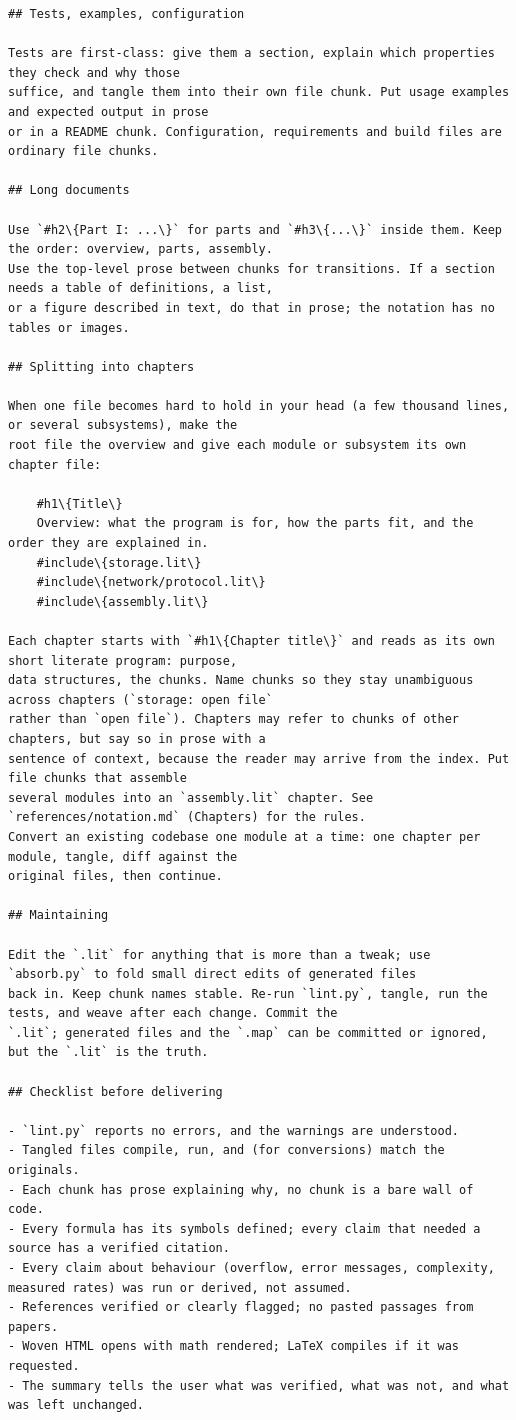 \documentclass[10pt,a4paper]{article}
\newcounter{chunk}
\begin{document}
\begin{Verbatim}
## Tests, examples, configuration

Tests are first-class: give them a section, explain which properties they check and why those
suffice, and tangle them into their own file chunk. Put usage examples and expected output in prose
or in a README chunk. Configuration, requirements and build files are ordinary file chunks.

## Long documents

Use `#h2\{Part I: ...\}` for parts and `#h3\{...\}` inside them. Keep the order: overview, parts, assembly.
Use the top-level prose between chunks for transitions. If a section needs a table of definitions, a list,
or a figure described in text, do that in prose; the notation has no tables or images.

## Splitting into chapters

When one file becomes hard to hold in your head (a few thousand lines, or several subsystems), make the
root file the overview and give each module or subsystem its own chapter file:

    #h1\{Title\}
    Overview: what the program is for, how the parts fit, and the order they are explained in.
    #include\{storage.lit\}
    #include\{network/protocol.lit\}
    #include\{assembly.lit\}

Each chapter starts with `#h1\{Chapter title\}` and reads as its own short literate program: purpose,
data structures, the chunks. Name chunks so they stay unambiguous across chapters (`storage: open file`
rather than `open file`). Chapters may refer to chunks of other chapters, but say so in prose with a
sentence of context, because the reader may arrive from the index. Put file chunks that assemble
several modules into an `assembly.lit` chapter. See `references/notation.md` (Chapters) for the rules.
Convert an existing codebase one module at a time: one chapter per module, tangle, diff against the
original files, then continue.

## Maintaining

Edit the `.lit` for anything that is more than a tweak; use `absorb.py` to fold small direct edits of generated files
back in. Keep chunk names stable. Re-run `lint.py`, tangle, run the tests, and weave after each change. Commit the
`.lit`; generated files and the `.map` can be committed or ignored, but the `.lit` is the truth.

## Checklist before delivering

- `lint.py` reports no errors, and the warnings are understood.
- Tangled files compile, run, and (for conversions) match the originals.
- Each chunk has prose explaining why, no chunk is a bare wall of code.
- Every formula has its symbols defined; every claim that needed a source has a verified citation.
- Every claim about behaviour (overflow, error messages, complexity, measured rates) was run or derived, not assumed.
- References verified or clearly flagged; no pasted passages from papers.
- Woven HTML opens with math rendered; LaTeX compiles if it was requested.
- The summary tells the user what was verified, what was not, and what was left unchanged.
\end{Verbatim}
\end{document}
